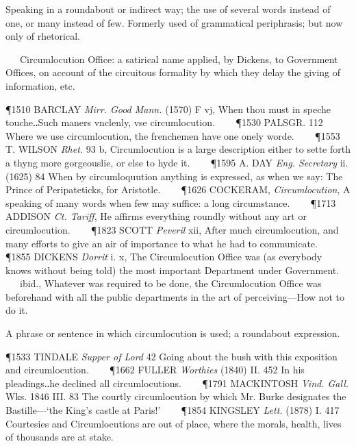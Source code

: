 \begin{description}[wide, labelwidth=!, labelindent=0pt]
\vspace{-0.3cm}

\begin{myenumerate}

 Speaking in a roundabout or indirect way; the use of several words instead of one, or many instead of few. Formerly used of grammatical periphrasis; but now only of rhetorical.

\noindent
   Circumlocution Office: a satirical name applied, by Dickens, to Government Offices, on account of the circuitous formality by which they delay the giving of information, etc.

\P 1510 BARCLAY  \textit{Mirr. Good Mann.} (1570) F vj, When thou must in speche touche‥Such maners vnclenly, vse circumlocution.    
\P 1530 PALSGR. 112 Where we use circumlocution, the frenchemen have one onely worde.    
\P 1553 T. WILSON  \textit{Rhet.} 93 b, Circumlocution is a large description either to sette forth a thyng more gorgeouslie, or else to hyde it.    
\P 1595 A. DAY  \textit{Eng. Secretary} ii. (1625) 84 When by circumloquution anything is expressed, as when we say: The Prince of Peripateticks, for Aristotle.    
\P 1626 COCKERAM,  \textit{Circumlocution}, A speaking of many words when few may suffice: a long circumstance.    
\P 1713 ADDISON  \textit{Ct. Tariff}, He affirms everything roundly without any art or circumlocution.    
\P 1823 SCOTT  \textit{Peveril} xii, After much circumlocution, and many efforts to give an air of importance to what he had to communicate.    
\P 1855 DICKENS  \textit{Dorrit} i. x, The Circumlocution Office was (as everybody knows without being told) the most important Department under Government.    ibid., Whatever was required to be done, the Circumlocution Office was beforehand with all the public departments in the art of perceiving—How not to do it.

 A phrase or sentence in which circumlocution is used; a roundabout expression.

\P 1533 TINDALE  \textit{Supper of Lord} 42 Going about the bush with this exposition and circumlocution.    
\P 1662 FULLER  \textit{Worthies} (1840) II. 452 In his pleadings‥he declined all circumlocutions.    
\P 1791 MACKINTOSH  \textit{Vind. Gall.} Wks. 1846 III.  83 The courtly circumlocution by which Mr. Burke designates the Bastille—‘the King's castle at Paris!’    
\P 1854 KINGSLEY  \textit{Lett.} (1878) I. 417 Courtesies and Circumlocutions are out of place, where the morals, health, lives of thousands are at stake.


\end{myenumerate}
\end{description}
